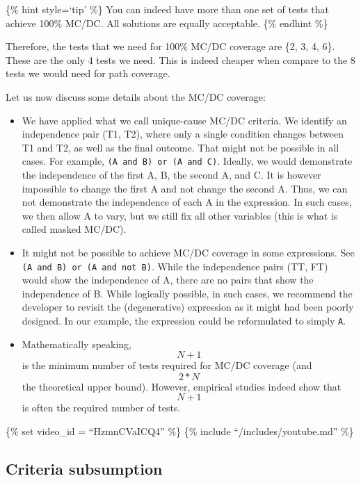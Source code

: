 \{\% hint style=`tip' \%\} You can indeed have more than one set of
tests that achieve 100\% MC/DC. All solutions are equally acceptable.
\{\% endhint \%\}

Therefore, the tests that we need for 100\% MC/DC coverage are \{2, 3,
4, 6\}. These are the only 4 tests we need. This is indeed cheaper when
compare to the 8 tests we would need for path coverage.

Let us now discuss some details about the MC/DC coverage:

\begin{itemize}
\item
  We have applied what we call unique-cause MC/DC criteria. We identify
  an independence pair (T1, T2), where only a single condition changes
  between T1 and T2, as well as the final outcome. That might not be
  possible in all cases. For example,
  \texttt{(A\ and\ B)\ or\ (A\ and\ C)}. Ideally, we would demonstrate
  the independence of the first A, B, the second A, and C. It is however
  impossible to change the first A and not change the second A. Thus, we
  can not demonstrate the independence of each A in the expression. In
  such cases, we then allow A to vary, but we still fix all other
  variables (this is what is called masked MC/DC).
\item
  It might not be possible to achieve MC/DC coverage in some
  expressions. See \texttt{(A\ and\ B)\ or\ (A\ and\ not\ B)}. While the
  independence pairs (TT, FT) would show the independence of A, there
  are no pairs that show the independence of B. While logically
  possible, in such cases, we recommend the developer to revisit the
  (degenerative) expression as it might had been poorly designed. In our
  example, the expression could be reformulated to simply \texttt{A}.
\item
  Mathematically speaking, \[N+1\] is the minimum number of tests
  required for MC/DC coverage (and \[2 * N\] the theoretical upper
  bound). However, empirical studies indeed show that \[N+1\] is often
  the required number of tests.
\end{itemize}

\{\% set video\_id = ``HzmnCVaICQ4'' \%\} \{\% include
``/includes/youtube.md'' \%\}

\hypertarget{criteria-subsumption}{%
\subsection{Criteria subsumption}\label{criteria-subsumption}}

